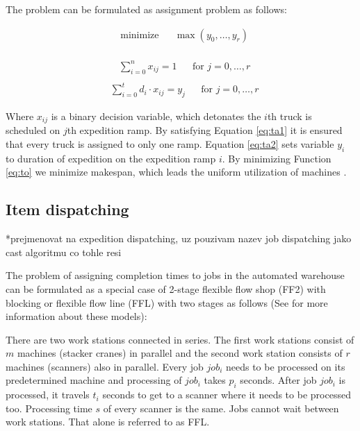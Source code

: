 \documentclass{ctuthesis}
\begin{document}
 
 The problem can be formulated as assignment problem as follows:
 
 \begin{equation}\label{eq:to}
\begin{aligned}
&\text{minimize}
&&\max(y_0, \ldots, y_r)
\end{aligned}
\end{equation}
\\
\begin{equation} \label{eq:ta1}
\begin{aligned}
    & \sum_{i=0}^{n} x_{ij} = 1 && \text{for } j=0, \ldots, r\\
\end{aligned}
\end{equation}
\begin{equation} \label{eq:ta2}
\begin{aligned}
    & \sum_{i=0}^{t} {d_i} \cdot x_{ij} = y_j && \text{for } j=0, \ldots, r
\end{aligned}
\end{equation}
  
Where $x_{ij}$ is a binary decision variable, which detonates the $i$th truck is scheduled on $j$th expedition ramp. By satisfying Equation \ref{eq:ta1} it is ensured that every truck is assigned to only one ramp. Equation \ref{eq:ta2} sets variable $y_i$ to duration of expedition on the expedition ramp $i$. By minimizing Function \ref{eq:to} we minimize makespan, which leads the uniform utilization of machines \cite{pinedo}.

 
\subsection{Item dispatching}*prejmenovat na expedition dispatching, uz pouzivam nazev job dispatching jako cast algoritmu co tohle resi
\label{subsec:expeditiondispatching}

The problem of assigning completion times to jobs in the automated warehouse can be formulated as a special case of 2-stage flexible flow shop (FF2) with blocking or flexible flow line (FFL) with two stages as follows (See \cite{pinedo} for more information about these models):

There are two work stations connected in series. The first work stations consist of $m$ machines (stacker cranes) in parallel and the second work station consists of $r$ machines (scanners) also in parallel. Every job $job_i$ needs to be processed on its predetermined machine and processing of $job_i$ takes $p_i$ seconds. After job $job_i$ is processed, it travels $t_i$ seconds to get to a scanner where it needs to be processed too. Processing time $s$ of every scanner is the same. Jobs cannot wait between work stations. That alone is referred to as FFL.
\end{document}
